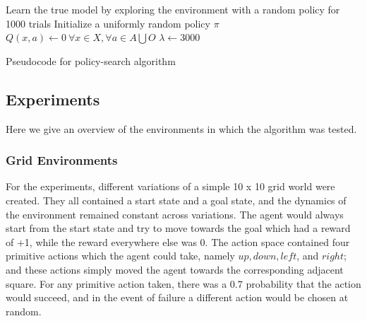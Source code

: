 \documentclass{acm_proc_article-sp}
\begin{document}
\begin{algorithm}[h!]
	\SetAlgoLined
	 Learn the true model by exploring the environment with a random policy for 1000 trials\;
	 Initialize a uniformly random policy $\pi$\;
	 $Q(x,a) \longleftarrow 0\ \forall x \in X, \forall a \in A \bigcup O$\;
	 $\lambda \longleftarrow 3000$\;
	 \caption{Pseudocode for policy-search algorithm}
\end{algorithm}

\subsection{Experiments}

Here we give an overview of the environments in which the algorithm was tested.

\subsubsection{Grid Environments}


For the experiments, different variations of a simple 10 x 10 grid world were created. They all contained a start state and a goal state, and the dynamics of the environment remained constant across variations. The agent would always start from the start state and try to move towards the goal which had a reward of +1, while the reward everywhere else was 0. The action space contained four primitive actions which the agent could take, namely $up, down, left$, and $right$; and these actions simply moved the agent towards the corresponding adjacent square. For any primitive action taken, there was a 0.7 probability that the action would succeed, and in the event of failure a different action would be chosen at random. 
\end{document}
